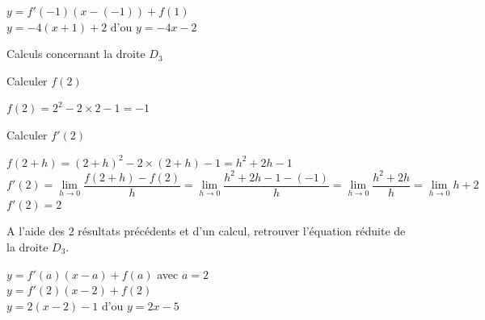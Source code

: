 \documentclass[12pt,a4paper]{article}  %
\begin{document}
\begin{enumMet}
\begin{enumMet}
\begin{corrBox}
	   		$y=f'(-1)(x-(-1))+f(1)$\\
	   		$y=-4(x+1)+2$ d'ou $y=-4x-2$	
	   	\end{corrBox}  
	\end{enumMet}
	\item {} Calculs concernant la droite $D_3$
	\begin{enumMet}
		\item {} Calculer $f(2)$ \quad {}
		\begin{corrBox}
			$f(2)=2^{2}-2\times 2-1=-1$	
		\end{corrBox}
		\item {} Calculer $f'(2)$ \quad {}
		\begin{corrBox}
			$f(2+h)=(2+h)^{2}-2\times (2+h)-1=h^2+2h-1$\\
			$f'(2)=\lim\limits_{h \rightarrow 0} \dfrac{f(2+h)-f(2)}{h}=\lim\limits_{h \rightarrow 0} \dfrac{h^2+2h-1-(-1)}{h}=\lim\limits_{h \rightarrow 0} \dfrac{h^2+2h}{h}=\lim\limits_{h \rightarrow 0} h+2$\\
			$f'(2)=2$
		\end{corrBox}
		\item {} A l'aide des 2 résultats précédents et d'un calcul, retrouver l'équation réduite de la droite $D_3$. \quad {} 
		\begin{corrBox}
			$y=f'(a)(x-a)+f(a)$ avec $a=2$\\
			$y=f'(2)(x-2)+f(2)$\\
			$y=2(x-2)-1$ d'ou $y=2x-5$	
		\end{corrBox}
	\end{enumMet}

\end{enumMet}
\end{document}
